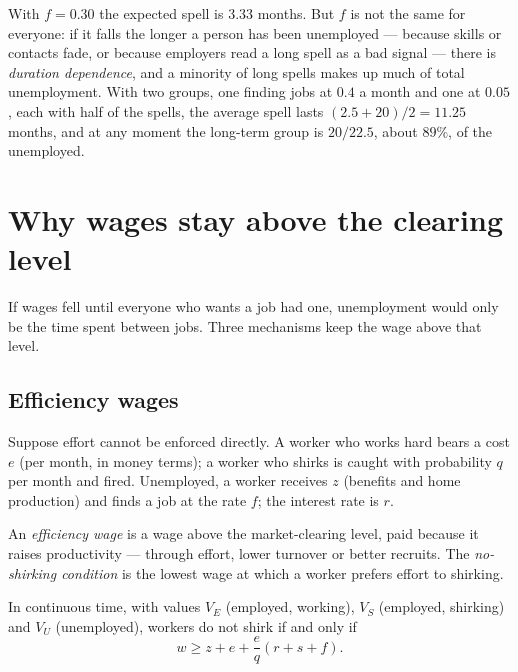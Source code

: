 With $f = 0.30$ the expected spell is 3.33 months. But $f$ is not the same for
everyone: if it falls the longer a person has been unemployed --- because
skills or contacts fade, or because employers read a long spell as a bad
signal --- there is \emph{duration dependence}, and a minority of long spells
makes up much of total unemployment. With two groups, one finding jobs at
$0.4$ a month and one at $0.05$, each with half of the spells, the average
spell lasts $(2.5 + 20)/2 = 11.25$ months, and at any moment the long-term group is
$20/22.5$, about $89\%$, of the unemployed.

\section{Why wages stay above the clearing level}\label{sec:b1:unemployment-flows:wages}

If wages fell until everyone who wants a job had one, unemployment would
only be the time spent between jobs. Three mechanisms keep the wage above
that level.

\subsection*{Efficiency wages}

Suppose effort cannot be enforced directly. A worker who works hard bears
a cost $e$ (per month, in money terms); a worker who shirks is caught with
probability $q$ per month and fired. Unemployed, a worker receives $z$
(benefits and home production) and finds a job at the rate $f$; the
interest rate is $r$.

\begin{definition}\label{def:b1:unemployment-flows:efficiency-wage}
An \emph{efficiency wage} is a wage above the market-clearing level, paid
because it raises productivity --- through effort, lower turnover or
better recruits. The \emph{no-shirking condition} is the lowest wage at which
a worker prefers effort to shirking.
\end{definition}

\begin{proposition}\label{prop:b1:unemployment-flows:nsc}
In continuous time, with values $V_E$ (employed, working), $V_S$ (employed,
shirking) and $V_U$ (unemployed), workers do not shirk if and only if
\[
w \ge z + e + \frac{e}{q}(r + s + f).
\]
\end{proposition}

